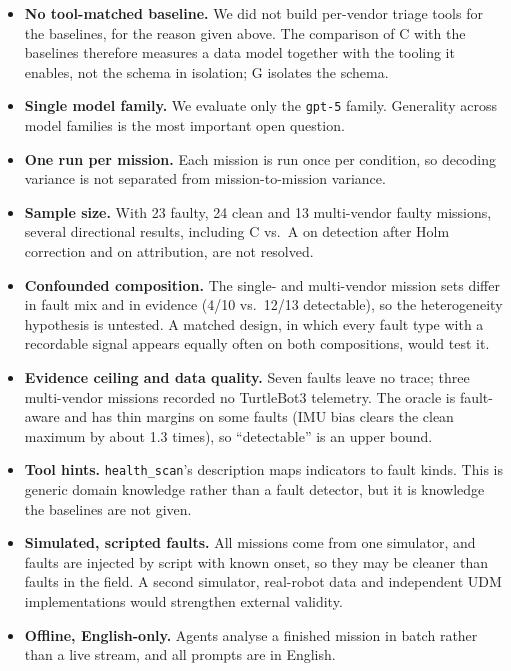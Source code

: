 \documentclass[conference]{IEEEtran}
\newcommand{\condA}{A}
\newcommand{\condC}{C}
\newcommand{\condG}{G}
\newcommand{\hs}{\texttt{health\_scan}}
\begin{document}
\begin{itemize}
  \item \textbf{No tool-matched baseline.} We did not build per-vendor triage tools
  for the baselines, for the reason given above. The comparison of \condC{} with
  the baselines therefore measures a data model together with the tooling it
  enables, not the schema in isolation; \condG{} isolates the schema.
  \item \textbf{Single model family.} We evaluate only the \texttt{gpt-5} family.
  Generality across model families is the most important open question.
  \item \textbf{One run per mission.} Each mission is run once per condition, so
  decoding variance is not separated from mission-to-mission variance.
  \item \textbf{Sample size.} With 23 faulty, 24 clean and 13 multi-vendor faulty
  missions, several directional results, including \condC{} vs.\ \condA{} on
  detection after Holm correction and on attribution, are not resolved.
  \item \textbf{Confounded composition.} The single- and multi-vendor mission sets
  differ in fault mix and in evidence (4/10 vs.\ 12/13 detectable), so the
  heterogeneity hypothesis is untested. A matched design, in which every fault type
  with a recordable signal appears equally often on both compositions, would test
  it.
  \item \textbf{Evidence ceiling and data quality.} Seven faults leave no trace;
  three multi-vendor missions recorded no TurtleBot3 telemetry. The oracle is
  fault-aware and has thin margins on some faults (IMU bias clears the clean
  maximum by about 1.3 times), so ``detectable'' is an upper bound.
  \item \textbf{Tool hints.} \hs{}'s description maps indicators to fault kinds.
  This is generic domain knowledge rather than a fault detector, but it is
  knowledge the baselines are not given.
  \item \textbf{Simulated, scripted faults.} All missions come from one simulator,
  and faults are injected by script with known onset, so they may be cleaner than
  faults in the field. A second simulator, real-robot data and independent UDM
  implementations would strengthen external validity.
  \item \textbf{Offline, English-only.} Agents analyse a finished mission in batch
  rather than a live stream, and all prompts are in English.
\end{itemize}
\end{document}
